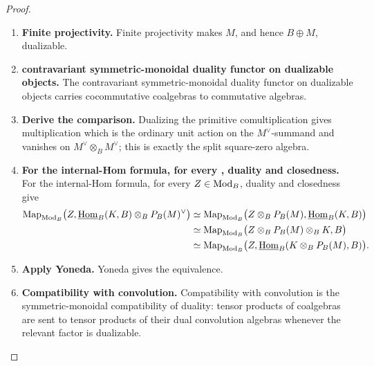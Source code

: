 \begin{proof}
\leavevmode
\begin{enumerate}[label=\textup{(\arabic*)}]
    \item \textbf{Finite projectivity.}
    Finite projectivity makes \(M\), and hence \(B\oplus M\), dualizable.

    \item \textbf{contravariant symmetric-monoidal duality functor on dualizable objects.}
    The contravariant symmetric-monoidal duality functor on dualizable objects carries
    cocommutative coalgebras to commutative algebras.

    \item \textbf{Derive the comparison.}
    Dualizing the primitive comultiplication gives multiplication which is the ordinary unit
    action on the \(M^\vee\)-summand and vanishes on \(M^\vee\otimes_BM^\vee\); this is exactly the split
    square-zero algebra.

    \item \textbf{For the internal-Hom formula, for every , duality and closedness.}
    For the internal-Hom formula, for every \(Z\in\operatorname{Mod}_B\), duality and closedness give
    \[
    \begin{aligned}
        \operatorname{Map}_{\operatorname{Mod}_B}\bigl(Z,
          \underline{\operatorname{Hom}}_B(K,B)\otimes_BP_B(M)^\vee\bigr)
        &\simeq
        \operatorname{Map}_{\operatorname{Mod}_B}\bigl(Z\otimes_BP_B(M),
          \underline{\operatorname{Hom}}_B(K,B)\bigr)
        \\
        &\simeq
        \operatorname{Map}_{\operatorname{Mod}_B}\bigl(Z\otimes_BP_B(M)\otimes_BK,B\bigr)
        \\
        &\simeq
        \operatorname{Map}_{\operatorname{Mod}_B}\bigl(Z,
          \underline{\operatorname{Hom}}_B(K\otimes_BP_B(M),B)\bigr).
    \end{aligned}
    \]

    \item \textbf{Apply Yoneda.}
    Yoneda gives the equivalence.

    \item \textbf{Compatibility with convolution.}
    Compatibility with convolution is the symmetric-monoidal compatibility of duality: tensor
    products of coalgebras are sent to tensor products of their dual convolution algebras
    whenever the relevant factor is dualizable.
\end{enumerate}
\end{proof}

